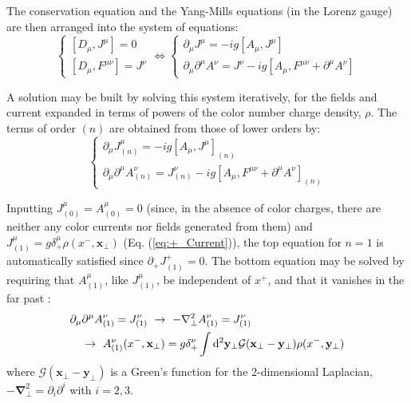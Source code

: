 The conservation equation and the Yang-Mills equations (in the Lorenz gauge) are then arranged into the system of equations:
\begin{equation}
	\begin{cases}
	[D_\mu, J^\mu] = 0 \\
	[D_\mu, F^{\mu \nu}] = J^\nu
	\end{cases} \Leftrightarrow
	\begin{cases}
	\partial_\mu J^\mu = -ig[A_\mu, J^\mu]  \\
	\partial_\mu \partial^\mu A^\nu = J^\nu - ig [A_\mu, F^{\mu \nu} + \partial^\mu A^\nu]
	\end{cases}
\end{equation}

A solution may be built by solving this system iteratively, for the fields and current expanded in terms of powers of the color number charge density, $\rho$. The terms of order $(n)$ are obtained from those of lower orders by:
\begin{equation}
	\begin{cases}
	\partial_\mu J_{(n)}^\mu = -ig[A_\mu, J^\mu]_{(n)}  \\
	\partial_\mu \partial^\mu A_{(n)}^\nu = J_{(n)}^\nu - ig [A_\mu, F^{\mu \nu} + \partial^\mu A^\nu]_{(n)}
	\end{cases}
\end{equation}


Inputting $J_{(0)}^\mu = A_{(0)}^\mu = 0$ (since, in the absence of color charges, there are neither any color currents nor fields generated from them) and $J_{(1)}^\mu = g \delta^{\mu}_+ \rho(x^-,\mathbf{x}_\perp)$  (Eq. (\ref{eq:+_Current})), the top equation for $n=1$ is automatically satisfied since $\partial_+ J^+_{(1)} = 0$. The bottom equation may be solved by requiring that $A^\mu_{(1)}$, like $J_{(1)}^\mu$, be independent of $x^+$, and that it vanishes in the far past \citep{Blaizot_2004}: 
\begin{equation}
\begin{split}
	\partial_\mu & \partial^\mu A_{(1)}^\nu = J_{(1)}^\nu ~ \to ~
	 - \mathbf{\nabla}_\perp^2 A_{(1)}^\nu = J_{(1)}^\nu \\
	 & \to ~ A^\nu_{(1)}(x^-,\mathbf{x}_\perp) =  g \delta^{\nu}_+  \int \mathop{}\!\mathrm{d}^2 \mathbf{y}_\perp \mathcal{G}(\mathbf{x_\perp} - \mathbf{y_\perp}) \rho(x^-,\mathbf{y}_\perp)
\end{split}
\label{eq:n_1_A}
\end{equation}
where $\mathcal{G}(\mathbf{x_\perp} - \mathbf{y_\perp})$ is a Green's function for the 2-dimensional Laplacian, $-\mathbf{\nabla}_\perp^2 = \partial_i \partial^i$ with $i=2,3$.

